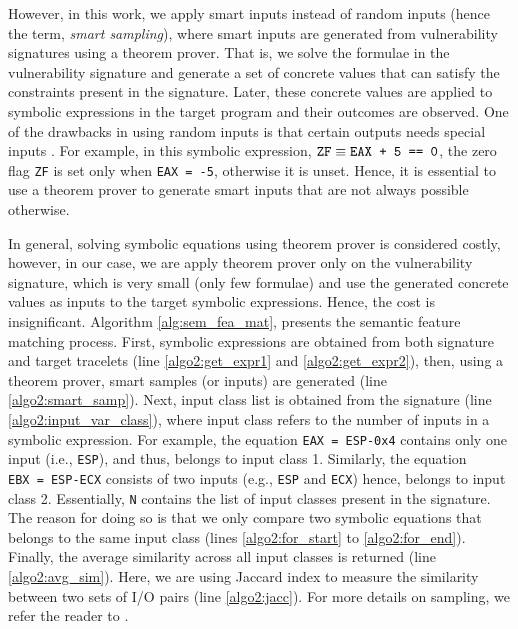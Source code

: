 However, in this work, we apply smart inputs instead of random inputs (hence the term, \textit{smart sampling}), where smart inputs are generated from vulnerability signatures using a theorem prover. That is, we solve the formulae in the vulnerability signature and generate a set of concrete values that can satisfy the constraints present in the signature. Later, these concrete values are applied to symbolic expressions in the target program and their outcomes are observed. One of the drawbacks in using random inputs is that certain outputs needs special inputs \cite{pewnycross}. For example, in this symbolic expression, $\text{\texttt{ZF}} \equiv \text{\texttt{EAX~+~5~==~0}}$, the zero flag \texttt{ZF} is set only when \texttt{EAX = -5}, otherwise it is unset. Hence, it is essential to use a theorem prover to generate smart inputs that are not always possible otherwise.

In general, solving symbolic equations using theorem prover is considered costly, however, in our case, we are apply theorem prover only on the vulnerability signature, which is very small (only few formulae) and use the generated concrete values as inputs to the target symbolic expressions. Hence, the cost is insignificant. Algorithm \ref{alg:sem_fea_mat}, presents the semantic feature matching process. First, symbolic expressions are obtained from both signature and target tracelets (line \ref{algo2:get_expr1} and \ref{algo2:get_expr2}), then, using a theorem prover, smart samples (or inputs) are generated (line \ref{algo2:smart_samp}). Next, input class list is obtained from the signature (line \ref{algo2:input_var_class}), where input class refers to the number of inputs in a symbolic expression. For example, the equation \texttt{EAX~=~ESP-0x4} contains only one input (i.e., \texttt{ESP}), and thus, belongs to input class 1. Similarly, the equation \texttt{EBX~=~ESP-ECX} consists of two inputs (e.g., \texttt{ESP} and \texttt{ECX}) hence, belongs to input class 2. Essentially, \texttt{N} contains the list of input classes present in the signature. The reason for doing so is that we only compare two symbolic equations that belongs to the same input class (lines \ref{algo2:for_start} to \ref{algo2:for_end}). Finally, the average similarity across all input classes is returned (line \ref{algo2:avg_sim}). Here, we are using Jaccard index \cite{jaccardindex} to measure the similarity between two sets of I/O pairs (line \ref{algo2:jacc}). For more details on sampling, we refer the reader to \cite{pewnycross}.


